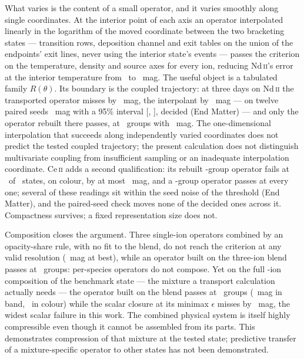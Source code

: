 \documentclass[aps,prl,twocolumn,superscriptaddress,nofootinbib,longbibliography]{revtex4-2}
\begin{document}
What varies is the content of a small operator, and it varies smoothly
along single coordinates. At the interior point of each axis an operator
interpolated linearly in the logarithm of the moved coordinate between the
two bracketing states --- transition rows, deposition channel and exit
tables on the union of the endpoints' exit lines, never using the interior
state's events --- passes the criterion on the temperature, density and
source axes for every ion, reducing Nd\,\textsc{ii}'s error at the interior
temperature from \PBNdFixT\ to \PBNdIntWT~mag. The useful object is a
tabulated family $R(\theta)$. Its boundary is the coupled trajectory: at
three days on Nd\,\textsc{ii} the transported operator misses by
\PBNdTrajAnchor~mag, the interpolant by \PBNdTrajWhole~mag --- on twelve
paired seeds \PBUNdTrajWhole~mag with a 95\% interval
[\PBUNdTrajWholeLo, \PBUNdTrajWholeHi], decided (End Matter) --- and only
the operator rebuilt there passes, at \PBNdTrajKrec\ groups with
\PBNdTrajFresh~mag. The one-dimensional interpolation that succeeds along
independently varied coordinates does not predict the tested coupled
trajectory; the present calculation does not distinguish multivariate
coupling from insufficient sampling or an inadequate interpolation
coordinate. Ce\,\textsc{ii} adds a
second qualification: its rebuilt \PBNgT-group operator fails at
\PBCeNFreshFail\ of \PBCeNStates\ states, on colour, by at most
\PBCeWorstColourOver~mag, and a \PBCeKrecMax-group operator passes at
every one; several of these readings sit within the seed noise of the
threshold (End Matter), and the paired-seed check moves none of the
decided ones across it. Compactness survives; a fixed representation size
does not.

Composition closes the argument. Three single-ion operators combined by an
opacity-share rule, with no fit to the blend, do not reach the criterion at
any valid resolution (\PBAmixBestBand~mag at best), while an operator
built on the three-ion blend passes at \PBKdirect\ groups: per-species
operators do not compose. Yet on the full \PBBlendNIons-ion composition of
the benchmark state --- the mixture a transport calculation actually needs
--- the operator built on the blend passes at \PBBlendKrec\ groups
(\PBBlendBand~mag in band, \PBBlendColour\ in colour) while the scalar
closure at its minimax $\epsilon$ misses by \PBBlendEpsMMErr~mag, the
widest scalar failure in this work. The combined physical system is itself
highly compressible even though it cannot be assembled from its parts.
This demonstrates compression of that mixture at the tested state;
predictive transfer of a mixture-specific operator to other states has not
been demonstrated.
\end{document}
